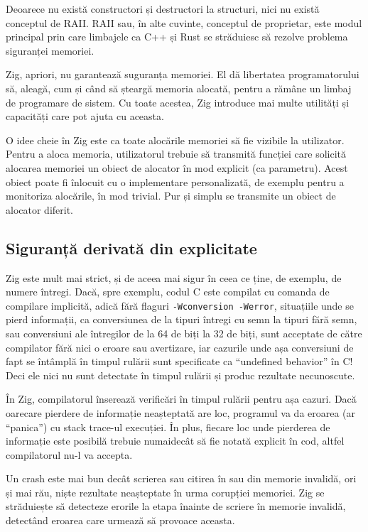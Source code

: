 \documentclass[a4paper,12pt]{report}
\begin{document}
Deoarece nu există constructori și destructori la structuri,
nici nu există conceptul de \ac{RAII}.
\ac{RAII} sau, în alte cuvinte, conceptul de proprietar, este modul principal
prin care limbajele ca C++ și Rust se străduiesc să rezolve problema siguranței memoriei.

Zig, apriori, nu garantează suguranța memoriei.
El dă libertatea programatorului să, aleagă, cum și când să șteargă memoria alocată,
pentru a rămâne un limbaj de programare de sistem.
Cu toate acestea, Zig introduce mai multe utilități și capacități care pot ajuta cu aceasta.

O idee cheie în Zig este ca toate alocările memoriei să fie vizibile la utilizator.
Pentru a aloca memoria, utilizatorul trebuie să transmită funcției care solicită alocarea memoriei
un obiect de alocator în mod explicit (ca parametru).
Acest obiect poate fi înlocuit cu o implementare personalizată,
de exemplu pentru a monitoriza alocările, în mod trivial.
Pur și simplu se transmite un obiect de alocator diferit.


\subsection{Siguranță derivată din explicitate}

Zig este mult mai strict, și de aceea mai sigur în ceea ce ține, de exemplu, de numere întregi.
Dacă, spre exemplu, codul C este compilat cu comanda de compilare implicită,
adică fără flaguri \texttt{-Wconversion -Werror}, situațiile unde se pierd informații,
ca conversiunea de la tipuri întregi cu semn la tipuri fără semn, sau conversiuni ale întregilor
de la 64 de biți la 32 de biți, sunt acceptate de către compilator fără nici o eroare sau avertizare,
iar cazurile unde așa conversiuni de fapt se întâmplă în timpul rulării
sunt specificate ca ``undefined behavior'' în C!
Deci ele nici nu sunt detectate în timpul rulării și produc rezultate necunoscute.

În Zig, compilatorul înserează verificări în timpul rulării pentru așa cazuri.
Dacă oarecare pierdere de informație neașteptată are loc,
programul va da eroarea (ar ``panica'') cu stack trace-ul execuției.
În plus, fiecare loc unde pierderea de informație este posibilă trebuie numaidecât
să fie notată explicit în cod, altfel compilatorul nu-l va accepta.

Un crash este mai bun decât scrierea sau citirea în sau din memorie invalidă,
ori și mai rău, niște rezultate neașteptate în urma corupției memoriei.
Zig se străduiește să detecteze erorile la etapa înainte
de scriere în memorie invalidă, detectând eroarea care urmează să provoace aceasta.
\end{document}
